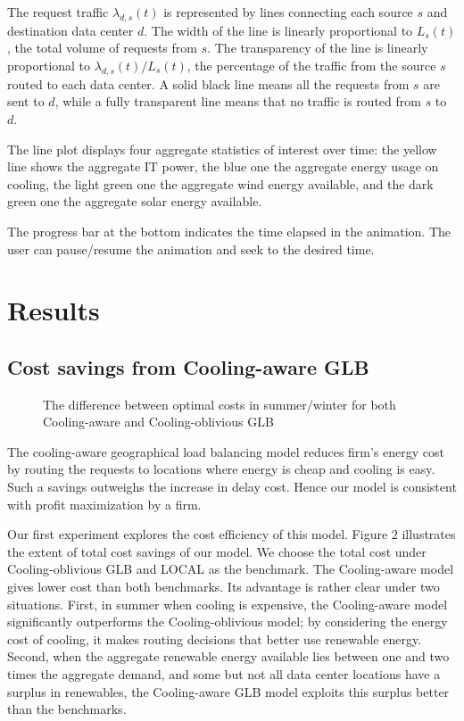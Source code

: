 \documentclass{acm_proc_article-sp}
\begin{document}
The request traffic $\lambda_{d,s}(t)$ is represented by lines connecting each source $s$ and destination data center $d$. The width of the line is linearly proportional to $L_s(t)$, the total volume of requests from $s$. The transparency of the line is linearly proportional to ${\lambda_{d,s}(t)} / {L_s(t)}$, the percentage of the traffic from the source $s$ routed to each data center. A solid black line means all the requests from $s$ are sent to $d$, while a fully transparent line means that no traffic is routed from $s$ to $d$.

The line plot displays four aggregate statistics of interest over time: the yellow line shows the aggregate IT power, the blue one the aggregate energy usage on cooling, the light green one the aggregate wind energy available, and the dark green one the aggregate solar energy available.

The progress bar at the bottom indicates the time elapsed in the animation. The user can pause/resume the animation and seek to the desired time.


\section{Results}
\subsection{Cost savings from Cooling-aware GLB}

\begin{figure}
\centering
{}
\caption{The difference between optimal costs in summer/winter for both Cooling-aware and Cooling-oblivious GLB}
\end{figure}

The cooling-aware geographical load balancing model reduces firm's energy cost by routing the requests to locations where energy is cheap and cooling is easy. Such a savings outweighs the increase in delay cost. Hence our model is consistent with profit maximization by a firm.


Our first experiment explores the cost efficiency of this model. Figure 2 illustrates the extent of total cost savings of our model. We choose the total cost under Cooling-oblivious GLB and LOCAL as the benchmark. The Cooling-aware model gives lower cost than both benchmarks. Its advantage is rather clear under two situations. First, in summer when cooling is expensive, the Cooling-aware model significantly outperforms the Cooling-oblivious model; by considering the energy cost of cooling, it makes routing decisions that better use renewable energy. Second, when the aggregate renewable energy available lies between one and two times the aggregate demand, and some but not all data center locations have a surplus in renewables, the Cooling-aware GLB model exploits this surplus better than the benchmarks.
\end{document}
